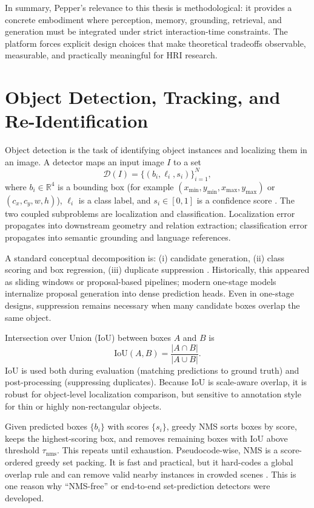   In summary, Pepper’s relevance to this thesis is methodological: it provides a concrete embodiment where perception, memory, grounding, retrieval, and generation must be integrated under strict
  interaction-time constraints. The platform forces explicit design choices that make theoretical tradeoffs observable, measurable, and practically meaningful for HRI research.


  \section{Object Detection, Tracking, and Re-Identification}

  Object detection is the task of identifying object instances and localizing them in an image. A detector maps an input image \(I\) to a set
  \[
  \mathcal{D}(I)=\{(b_i,\ell_i,s_i)\}_{i=1}^{N},
  \]
  where \(b_i\in\mathbb{R}^4\) is a bounding box (for example \((x_{\min},y_{\min},x_{\max},y_{\max})\) or \((c_x,c_y,w,h)\)), \(\ell_i\) is a class label, and \(s_i\in[0,1]\) is a confidence score
  \cite[Part XIII]{foundationsCVbook}. The two coupled subproblems are localization and classification. Localization error propagates into downstream geometry and relation extraction; classification
  error propagates into semantic grounding and language references.

    A standard conceptual decomposition is: (i) candidate generation, (ii) class scoring and box regression, (iii) duplicate suppression \cite{foundationsCVbook}. Historically, this appeared as sliding
  windows or proposal-based pipelines; modern one-stage models internalize proposal generation into dense prediction heads. Even in one-stage designs, suppression remains necessary when many candidate
  boxes overlap the same object.

    Intersection over Union (IoU) between boxes \(A\) and \(B\) is
  \[
  \mathrm{IoU}(A,B)=\frac{|A\cap B|}{|A\cup B|}.
  \]
  IoU is used both during evaluation (matching predictions to ground truth) and post-processing (suppressing duplicates). Because IoU is scale-aware overlap, it is robust for object-level localization
  comparison, but sensitive to annotation style for thin or highly non-rectangular objects.

    Given predicted boxes \(\{b_i\}\) with scores \(\{s_i\}\), greedy NMS sorts boxes by score, keeps the highest-scoring box, and removes remaining boxes with IoU above threshold \(\tau_{\text{nms}}\).
  This repeats until exhaustion. Pseudocode-wise, NMS is a score-ordered greedy set packing. It is fast and practical, but it hard-codes a global overlap rule and can remove valid nearby instances in
  crowded scenes \cite{hosang_learning_2017}. This is one reason why \enquote{NMS-free} or end-to-end set-prediction detectors were developed.

